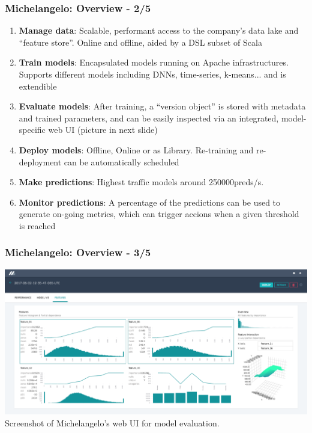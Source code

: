 \documentclass[hyperref={pdfpagelabels=false}]{beamer}
\begin{document}
        \begin{frame}
       \frametitle{Michelangelo: Overview - 2/5}
       \begin{enumerate}
       \item \normalsize{\textbf{Manage data}: Scalable, performant access to the company's data lake and ``feature store''. Online and offline, aided by a DSL subset of Scala}
       \item \normalsize{\textbf{Train models}: Encapsulated models running on Apache infrastructures. Supports different models including DNNs, time-series, k-means... and is extendible}
       \item \normalsize{\textbf{Evaluate models}: After training, a ``version object'' is stored with metadata and trained parameters, and can be easily inspected via an integrated, model-specific web UI (picture in next slide)}
       \item \normalsize{\textbf{Deploy models}: Offline, Online or as Library. Re-training and re-deployment can be automatically scheduled}
       \item \normalsize{\textbf{Make predictions}: Highest traffic models around 250000preds/s. }
       \item \normalsize{\textbf{Monitor predictions}: A percentage of the predictions can be used to generate on-going metrics, which can trigger accions when a given threshold is reached}
       \end{enumerate}
     \end{frame}


        \begin{frame}
          \frametitle{Michelangelo: Overview - 3/5}
          \begin{center}
            \includegraphics[scale=0.17]{michelangelo_overview.png}
            \scriptsize{\\Screenshot of Michelangelo's web UI for model evaluation\cite{michelangelo}.}
          \end{center}
        \end{frame}
\end{document}
